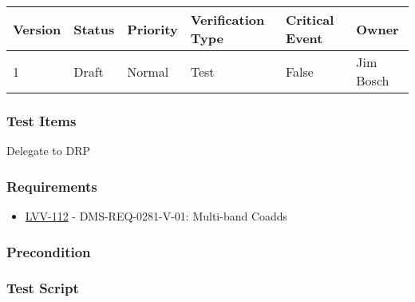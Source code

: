 \begin{longtable}[]{@{}llllll@{}}
\toprule
Version & Status & Priority & Verification Type & Critical Event &
Owner\tabularnewline
\midrule
\endhead
1 & Draft & Normal & Test & False & Jim Bosch\tabularnewline
\bottomrule
\end{longtable}

\hypertarget{test-items-51}{%
\subsubsection{Test Items}\label{test-items-51}}

Delegate to DRP

\hypertarget{requirements-52}{%
\subsubsection{Requirements}\label{requirements-52}}

\begin{itemize}
\tightlist
\item
  \href{https://jira.lsstcorp.org/browse/LVV-112}{LVV-112} -
  DMS-REQ-0281-V-01: Multi-band Coadds
\end{itemize}

\hypertarget{precondition-6}{%
\subsubsection{Precondition}\label{precondition-6}}

\hypertarget{test-script-52}{%
\subsubsection{Test Script}\label{test-script-52}}

